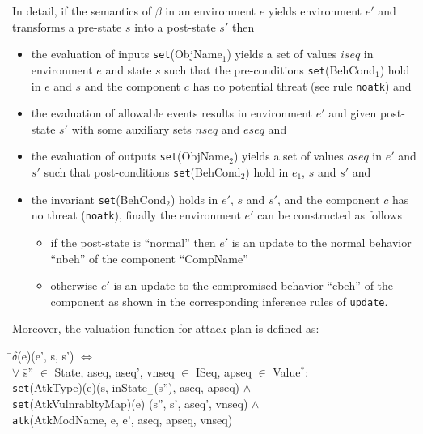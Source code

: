 \documentclass[conference]{IEEEtran}
\begin{document}
In detail, if the semantics of $\beta$ in an environment $e$ yields environment $e'$ and transforms a pre-state $s$ into a post-state $s'$ then
\begin{itemize}
\item the evaluation of inputs \texttt{set}(ObjName$_1$) yields a set of values $iseq$ in environment $e$ and state $s$ such that the pre-conditions \texttt{set}(BehCond$_1$) hold in $e$ and $s$ and the component $c$ has no potential threat ({see rule \tt noatk}) and
\item the evaluation of allowable events results in environment $e'$ and given post-state $s'$ with some auxiliary sets $nseq$ and $eseq$ and
\item the evaluation of outputs \texttt{set}(ObjName$_2$) yields a set of values $oseq$ in $e'$ and $s'$ such that post-conditions \texttt{set}(BehCond$_2$) hold in $e_1$, $s$ and $s'$ and
\item the invariant  \texttt{set}(BehCond$_2$) holds in $e'$, $s$ and $s'$, and the component $c$ has no threat ({\tt noatk}), finally the environment $e'$ can be constructed as follows
\begin{itemize}
\item if the post-state is ``normal'' then $e'$ is an update to the normal behavior ``nbeh'' of the component ``CompName''
\item otherwise $e'$ is an update to the compromised behavior ``cbeh'' of the component as shown in the corresponding inference rules of {\tt update}.
\end{itemize}
\end{itemize}
\enlargethispage*{1cm}
Moreover, the valuation function for attack plan is defined as:
\begin{tabbing}
\textlbrackdbl \=$\delta$\textrbrackdbl (e)(e', s, s') $\Leftrightarrow$ 
\\\> $\forall$ \= s'' $\in$ State, aseq, aseq', vnseq $\in$ ISeq, apseq $\in$ Value$^*$: \\\>\> \textlbrackdbl \texttt{set}(AtkType)\textrbrackdbl (e)(s, inState$_\bot$(s''), aseq, apseq) $\wedge$ 
\\\>\> \textlbrackdbl \texttt{set}(AtkVulnrabltyMap)\textrbrackdbl (e) (s'', s', aseq', vnseq) $\wedge$ 
\\\>\> {\tt atk}(AtkModName, e, e', aseq, apseq, vnseq)
\end{tabbing}
\end{document}

